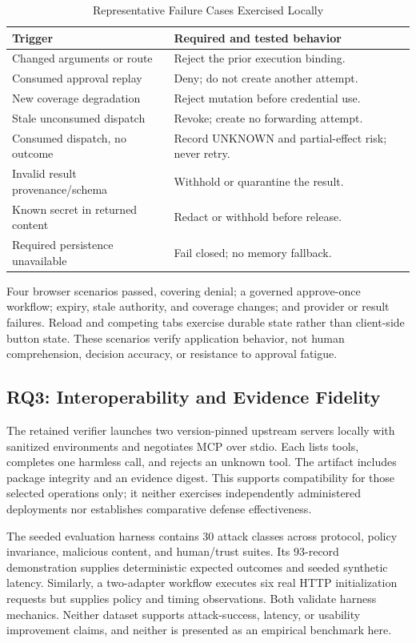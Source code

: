 \documentclass[conference,letterpaper]{IEEEtran}
\begin{document}
\begin{table}[t]
\caption{Representative Failure Cases Exercised Locally}
\label{tab:failures}
\centering\footnotesize
\begin{tabular}{L{.40\columnwidth}L{.51\columnwidth}}
\toprule
Trigger & Required and tested behavior \\
\midrule
Changed arguments or route & Reject the prior execution binding. \\
Consumed approval replay & Deny; do not create another attempt. \\
New coverage degradation & Reject mutation before credential use. \\
Stale unconsumed dispatch & Revoke; create no forwarding attempt. \\
Consumed dispatch, no outcome & Record UNKNOWN and partial-effect risk; never retry. \\
Invalid result provenance/schema & Withhold or quarantine the result. \\
Known secret in returned content & Redact or withhold before release. \\
Required persistence unavailable & Fail closed; no memory fallback. \\
\bottomrule
\end{tabular}
\end{table}

Four browser scenarios passed, covering denial; a governed approve-once workflow; expiry, stale authority, and coverage changes; and provider or result failures. Reload and competing tabs exercise durable state rather than client-side button state. These scenarios verify application behavior, not human comprehension, decision accuracy, or resistance to approval fatigue.

\subsection{RQ3: Interoperability and Evidence Fidelity}
The retained verifier launches two version-pinned upstream servers locally with sanitized environments and negotiates MCP over stdio. Each lists tools, completes one harmless call, and rejects an unknown tool. The artifact includes package integrity and an evidence digest. This supports compatibility for those selected operations only; it neither exercises independently administered deployments nor establishes comparative defense effectiveness.

The seeded evaluation harness contains 30 attack classes across protocol, policy invariance, malicious content, and human/trust suites. Its 93-record demonstration supplies deterministic expected outcomes and seeded synthetic latency. Similarly, a two-adapter workflow executes six real HTTP initialization requests but supplies policy and timing observations. Both validate harness mechanics. Neither dataset supports attack-success, latency, or usability improvement claims, and neither is presented as an empirical benchmark here.
\end{document}
